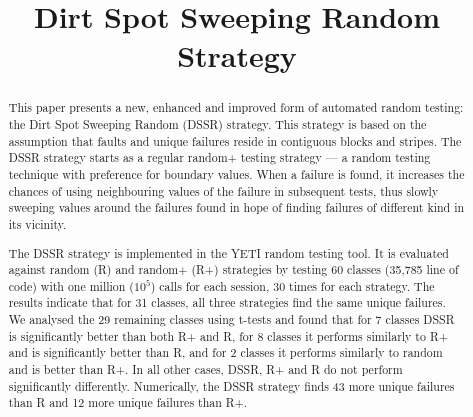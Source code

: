 \documentclass[conference]{IEEEtran}
\begin{document}
\title{Dirt Spot Sweeping Random Strategy}
\author{

\and
{}
}
\maketitle


\begin{abstract}
This paper presents a new, enhanced and improved form of automated random testing: the Dirt Spot Sweeping Random (DSSR) strategy. This strategy is based on the assumption that faults and unique failures reside in contiguous blocks and stripes. The DSSR strategy starts as a regular random+ testing strategy --- a random testing technique with preference for boundary values. When a failure is found, it increases the chances of using neighbouring values of the failure in subsequent tests, thus slowly sweeping values around the failures found in hope of finding failures of different kind in its vicinity.

The DSSR strategy is implemented in the YETI random testing tool. It is evaluated against random (R) and random+ (R+) strategies by testing 60 classes (35,785 line of code) with one million ($10^5$) calls for each session, 30 times for each strategy.
The results indicate that for 31 classes, all three strategies find the same unique failures. We analysed the 29 remaining classes using t-tests and found that for 7 classes DSSR is significantly better than both R+ and R, for 8 classes it performs similarly to R+ and is significantly better than R, and for 2 classes it performs similarly to random and is better than R+. In all other cases, DSSR, R+ and R do not perform significantly differently.
Numerically, the DSSR strategy finds 43 more unique failures than R and 12 more unique failures than R+.\end{abstract}
\IEEEpeerreviewmaketitle
\end{document}

